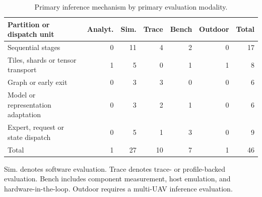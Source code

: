 \begin{table}[!tp]
\caption{Primary inference mechanism by primary evaluation modality.}\label{tab:settings}
\centering\small\setlength{\tabcolsep}{4pt}
\begin{tabular}{@{}p{.31\linewidth}rrrrrr@{}}
\toprule
Partition or dispatch unit & Analyt. & Sim. & Trace & Bench & Outdoor & Total \\
\midrule
Sequential stages & 0 & 11 & 4 & 2 & 0 & 17 \\
Tiles, shards or tensor transport & 1 & 5 & 0 & 1 & 1 & 8 \\
Graph or early exit & 0 & 3 & 3 & 0 & 0 & 6 \\
Model or representation adaptation & 0 & 3 & 2 & 1 & 0 & 6 \\
Expert, request or state dispatch & 0 & 5 & 1 & 3 & 0 & 9 \\
Total & 1 & 27 & 10 & 7 & 1 & 46 \\
\bottomrule
\end{tabular}
\par\smallskip\raggedright Sim. denotes software evaluation. Trace denotes trace- or profile-backed evaluation. Bench includes component measurement, host emulation, and hardware-in-the-loop. Outdoor requires a multi-UAV inference evaluation.
\end{table}
